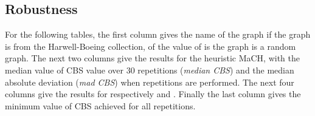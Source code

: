 \documentclass{scrartcl}
\theoremstyle{plain}
\newcommand{\algo}{MaCH}
\newcommand{\cbs}{CBS}
\begin{document}
\clearpage

\subsection{Robustness}

For the following tables, the first column gives the name of the 
graph if the graph is from the Harwell-Boeing collection, of the value of 
 is the graph is a random graph. The next two columns give the results 
for the heuristic \algo{}, with the median value of \cbs{} value over 30 
repetitions (\emph{median \cbs{}}) and the median absolute deviation (\emph{mad 
\cbs{}}) when  repetitions are performed. The next four columns give the 
results for respectively  and . Finally the last column 
gives the minimum value of \cbs{} achieved for all repetitions.
\end{document}
